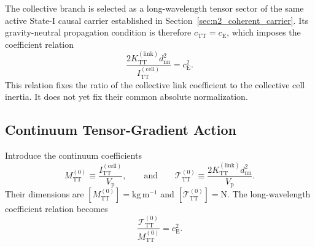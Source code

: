 The collective branch is selected as a long-wavelength tensor sector of the same active State-I causal carrier established in Section~\ref{sec:n2_coherent_carrier}. Its gravity-neutral propagation condition is therefore $c_{\mathrm{TT}}=c_{\mathrm{E}}$, which imposes the coefficient relation
\begin{equation}
    \frac{ 2K_{\mathrm{TT}}^{(\mathrm{link})} d_{\mathrm{nn}}^{2} }{ I_{\mathrm{TT}}^{(\mathrm{cell})} } = c_{\mathrm{E}}^{2}.
\end{equation}
This relation fixes the ratio of the collective link coefficient to the collective cell inertia. It does not yet fix their common absolute normalization.

\subsection{Continuum Tensor-Gradient Action}
\label{subsec:continuum_tensor_gradient_action}

Introduce the continuum coefficients
\begin{equation}
    M_{\mathrm{TT}}^{(0)} \equiv \frac{ I_{\mathrm{TT}}^{(\mathrm{cell})} }{ V_{\mathrm{p}} }, \qquad \text{and} \qquad \mathcal{T}_{\mathrm{TT}}^{(0)} \equiv \frac{ 2K_{\mathrm{TT}}^{(\mathrm{link})} d_{\mathrm{nn}}^{2} }{ V_{\mathrm{p}} }.
\end{equation}
Their dimensions are $[M_{\mathrm{TT}}^{(0)}] = \mathrm{kg\,m^{-1}}$ and $[\mathcal{T}_{\mathrm{TT}}^{(0)}] = \mathrm{N}$. The long-wavelength coefficient relation becomes
\begin{equation}
    \frac{ \mathcal{T}_{\mathrm{TT}}^{(0)} }{ M_{\mathrm{TT}}^{(0)} } = c_{\mathrm{E}}^{2}.
\end{equation}

